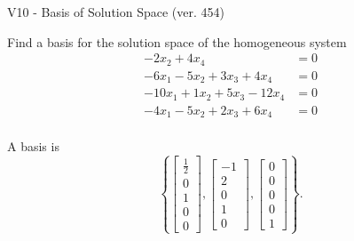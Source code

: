 \begin{exercise}
  \begin{exerciseTitle}V10 - Basis of Solution Space (ver. 454)\end{exerciseTitle}
  \begin{exerciseStatement}
    Find a basis for the solution space of the homogeneous system 
\begin{align*}
 -2 x_ 2 + 4 x_ 4 &= 0  \\ 
  -6 x_ 1 -5 x_ 2 + 3 x_ 3 + 4 x_ 4 &= 0  \\ 
  -10 x_ 1 + 1 x_ 2 + 5 x_ 3 -12 x_ 4 &= 0  \\ 
  -4 x_ 1 -5 x_ 2 + 2 x_ 3 + 6 x_ 4 &= 0  \\ 
 \end{align*}


 
  \end{exerciseStatement}

  \begin{exerciseAnswer}
   A basis is   
\[\left\{\left[\begin{array}{c}
\frac{1}{2} \\
0 \\
1 \\
0 \\
0
\end{array}\right] , \left[\begin{array}{c}
-1 \\
2 \\
0 \\
1 \\
0
\end{array}\right] , \left[\begin{array}{c}
0 \\
0 \\
0 \\
0 \\
1
\end{array}\right]\right\}.\]

  


  \end{exerciseAnswer}
\end{exercise}